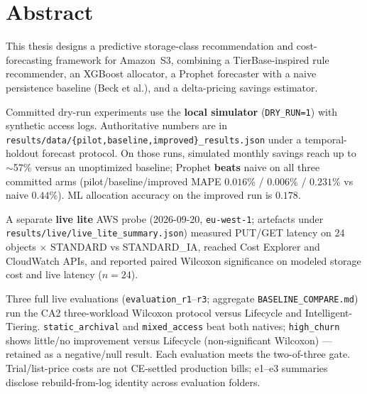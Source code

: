 \chapter*{Abstract}
This thesis designs a predictive storage-class recommendation and cost-forecasting framework for Amazon~S3, combining a TierBase-inspired rule recommender, an XGBoost allocator, a Prophet forecaster with a naive persistence baseline (Beck et al.), and a delta-pricing savings estimator.

Committed dry-run experiments use the \textbf{local simulator} (\texttt{DRY\_RUN=1}) with synthetic access logs. Authoritative numbers are in \texttt{results/data/\{pilot,baseline,improved\}\_results.json} under a temporal-holdout forecast protocol. On those runs, simulated monthly savings reach up to $\sim$57\% versus an unoptimized baseline; Prophet \textbf{beats} naive on all three committed arms (pilot/baseline/improved MAPE $0.016$\% / $0.006$\% / $0.231$\% vs naive $0.44$\%). ML allocation accuracy on the improved run is $0.178$.

A separate \textbf{live lite} AWS probe (2026-09-20, \texttt{eu-west-1}; artefacts under \texttt{results/live/live\_lite\_summary.json}) measured PUT/GET latency on 24 objects $\times$ STANDARD vs STANDARD\_IA, reached Cost Explorer and CloudWatch APIs, and reported paired Wilcoxon significance on modeled storage cost and live latency ($n{=}24$).

Three full live evaluations (\texttt{evaluation\_r1}--\texttt{r3}; aggregate \texttt{BASELINE\_COMPARE.md}) run the CA2 three-workload Wilcoxon protocol versus Lifecycle and Intelligent-Tiering. \texttt{static\_archival} and \texttt{mixed\_access} beat both natives; \texttt{high\_churn} shows little/no improvement versus Lifecycle (non-significant Wilcoxon) --- retained as a negative/null result. Each evaluation meets the two-of-three gate. Trial/list-price costs are not CE-settled production bills; e1--e3 summaries disclose rebuild-from-log identity across evaluation folders.

